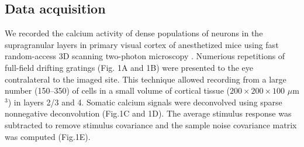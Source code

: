 \subsection*{Data acquisition}
We recorded the calcium activity  of dense populations of neurons in the supragranular layers in primary visual cortex of anesthetized mice using fast random-access 3D scanning two-photon microscopy \cite{Stosiek:2003,Reddy:2005}.  Numerious repetitions of full-field drifting gratings (Fig. 1A and 1B) were presented to the eye contralateral to the imaged site. This technique allowed recording from a large number (150--350) of cells in a small volume of cortical tissue ($200\times200\times100$ $\mu$m$^3$) in layers 2/3 and 4. Somatic calcium signals were deconvolved using  sparse nonnegative deconvolution \cite{Vogelstein:2010} (Fig.\;1C and 1D).  The average stimulus response was subtracted to remove stimulus covariance and the sample noise covariance matrix was computed (Fig.\;1E).


